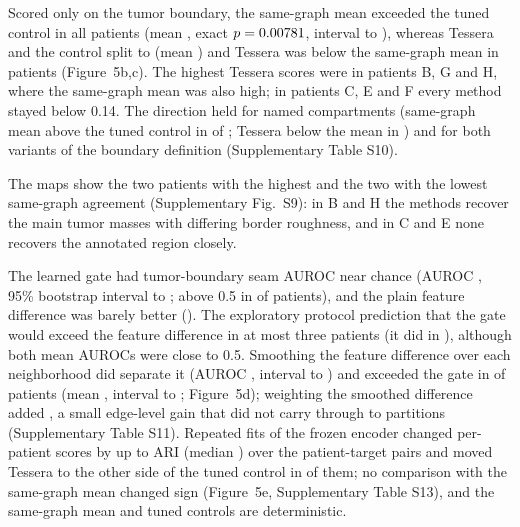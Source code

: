 \documentclass[11pt]{article}
\begin{document}
Scored only on the tumor boundary, the same-graph mean exceeded the tuned control in all \HerPatients{} patients (mean \HerBndUSixNestedMean{}, exact \(p=0.00781{}\), interval \HerBndUSixNestedLo{} to \HerBndUSixNestedHi{}), whereas Tessera and the control split \HerBndTessNestedPos{} to \HerBndTessNestedNeg{} (mean \HerBndTessNestedMean{}) and Tessera was below the same-graph mean in \HerBndTessUSixNeg{} patients (Figure~5b,c). The highest Tessera scores were in patients B, G and H, where the same-graph mean was also high; in patients C, E and F every method stayed below 0.14. The direction held for named compartments (same-graph mean above the tuned control in \HerCompUSixNestedPos{} of \HerPatients{}; Tessera below the mean in \HerCompTessUSixNeg{}) and for both variants of the boundary definition (Supplementary Table S10).

The maps show the two patients with the highest and the two with the lowest same-graph agreement (Supplementary Fig.~S9): in B and H the methods recover the main tumor masses with differing border roughness, and in C and E none recovers the annotated region closely.

The learned gate had tumor-boundary seam AUROC near chance (AUROC \HerBndSeamGate{}, 95\% bootstrap interval \HerBndSeamGateLo{} to \HerBndSeamGateHi{}; above 0.5 in \HerBndGateAboveChance{} of \HerPatients{} patients), and the plain feature difference was barely better (\HerBndSeamRaw{}). The exploratory protocol prediction that the gate would exceed the feature difference in at most three patients \HerHTwoVerdict{} (it did in \HerBndGateOverRaw{}), although both mean AUROCs were close to 0.5. Smoothing the feature difference over each neighborhood did separate it (AUROC \HerBndSeamSmooth{}, interval \HerBndSeamSmoothLo{} to \HerBndSeamSmoothHi{}) and exceeded the gate in \HerBndSeamSmoothGatePos{} of \HerPatients{} patients (mean \HerBndSeamSmoothGateMean{}, interval \HerBndSeamSmoothGateLo{} to \HerBndSeamSmoothGateHi{}; Figure~5d); weighting the smoothed difference added \HerBndSeamSmoothPlainMean{}, a small edge-level gain that did not carry through to partitions (Supplementary Table S11). Repeated fits of the frozen encoder changed per-patient scores by up to \RepMaxRange{} ARI (median \RepMedianRange{}) over the \RepPairs{} patient-target pairs and moved Tessera to the other side of the tuned control in \RepSignChangesControl{} of them; no comparison with the same-graph mean changed sign (Figure~5e, Supplementary Table S13), and the same-graph mean and tuned controls are deterministic.
\end{document}
